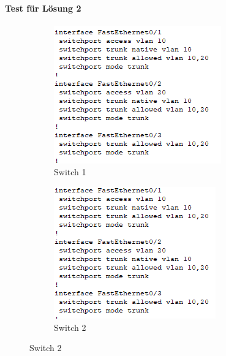 \paragraph{Test für Lösung 2}
\begin{figure}[!htb]
    \centering
    \begin{subfigure}{.45\textwidth}
        \includegraphics[width=\textwidth,height=\textwidth,keepaspectratio]{./img/test2/S1.png}
        \caption{Switch 1}
    \end{subfigure}
    \begin{subfigure}{.45\textwidth}
        \includegraphics[width=\textwidth,height=\textwidth,keepaspectratio]{./img/test2/S2.png}
        \caption{Switch 2}
    \end{subfigure}
\end{figure}
\FloatBarrier

